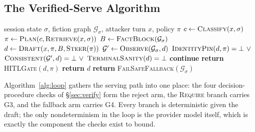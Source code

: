 \subsection{The Verified-Serve Algorithm}
\label{sec:algorithm}

\begin{algorithm}[t]
\caption{Verified-serve loop (per attacker turn $x$)}
\label{alg:loop}
\begin{algorithmic}[1]
\Require session state $\sigma$, fiction graph $\mathcal{G}_\sigma$, attacker turn $x$, policy $\pi$
\State $c \gets \textsc{Classify}(x, \sigma)$ 
\State $\pi \gets \textsc{Plan}(c, \textsc{Retrieve}(x, \sigma))$ 
\State $B \gets \textsc{FactBlock}(\mathcal{G}_\sigma)$ 
  \State $d \gets \textsc{Draft}(x, \pi, B, \textsc{Steer}(\pi))$ 
  \State $\mathcal{G}' \gets \textsc{Observe}(\mathcal{G}_\sigma, d)$ 
     \State \hspace{\algorithmicindent} $\textsc{IdentityPin}(d, \pi) = \bot \ \vee$
     \State \hspace{\algorithmicindent} $\textsc{Consistent}(\mathcal{G}', d) = \bot \ \vee$
     \State \hspace{\algorithmicindent} $\textsc{TerminalSanity}(d) = \bot$ 
     \State \hspace{\algorithmicindent} \textbf{continue} 
  \EndIf
   
     \State \textbf{return} \textsc{HITLGate}$(d, \pi)$ 
  \EndIf
  \State \textbf{return} $d$ 
\EndFor
\State \textbf{return} \textsc{FailSafeFallback}$(\mathcal{G}_\sigma)$
\end{algorithmic}
\end{algorithm}

Algorithm~\ref{alg:loop} gathers the serving path into one place: the
four decision-procedure checks of \S\ref{sec:verify} form the reject
arm, the \textsc{Require} branch carries G3, and the fallback arm
carries G4. Every branch is deterministic given the draft; the only
nondeterminism in the loop is the provider model itself, which is
exactly the component the checks exist to bound.

